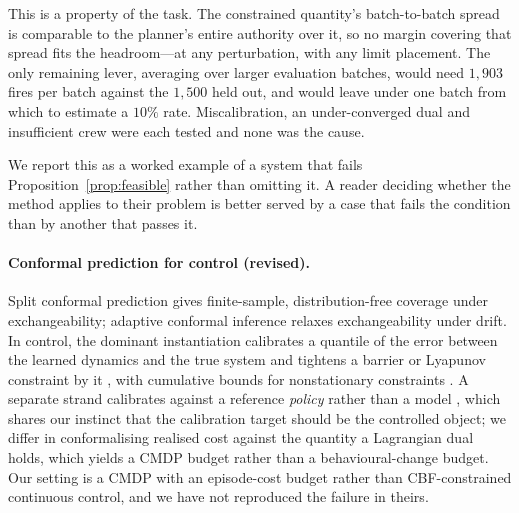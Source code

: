 This is a property of the task. The constrained quantity's batch-to-batch
spread is comparable to the planner's entire authority over it, so no margin
covering that spread fits the headroom---at any perturbation, with any limit
placement. The only remaining lever, averaging over larger evaluation batches,
would need $1{,}903$ fires per batch against the $1{,}500$ held out, and would
leave under one batch from which to estimate a $10\%$ rate. Miscalibration, an
under-converged dual and insufficient crew were each tested and none was the
cause.

We report this as a worked example of a system that fails
Proposition~\ref{prop:feasible} rather than omitting it. A reader deciding
whether the method applies to their problem is better served by a case that
fails the condition than by another that passes it.

\paragraph{Conformal prediction for control (revised).}
Split conformal prediction \citep{vovk2005alrw,lei2018splitconformal,
angelopoulos2023gentle} gives finite-sample, distribution-free coverage under
exchangeability; adaptive conformal inference \citep{gibbs2021aci} relaxes
exchangeability under drift. In control, the dominant instantiation calibrates
a quantile of the error between the learned dynamics and the true system and
tightens a barrier or Lyapunov constraint by it
\citep{lindemann2023safeplanning,zhou2025acpsafe,
mirzaeedodangeh2026robustcbf}, with cumulative bounds for nonstationary
constraints \citep{tomashevskiy2026proactive}. A separate strand calibrates
against a reference \emph{policy} rather than a model
\citep{prinster2026cpc}, which shares our instinct that the calibration target
should be the controlled object; we differ in conformalising realised cost
against the quantity a Lagrangian dual holds, which yields a CMDP budget
rather than a behavioural-change budget. Our setting is a CMDP with an
episode-cost budget rather than CBF-constrained continuous control, and we
have not reproduced the failure in theirs.
